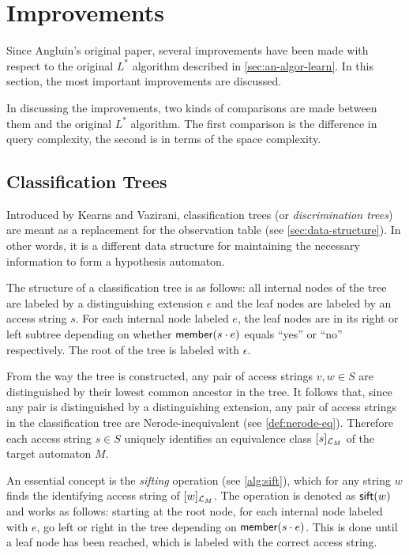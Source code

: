 \documentclass[multi,crop=false,class=article]{standalone}
\begin{document}
\section{Improvements}
\label{sec:improvements}
Since Angluin's original paper, several improvements have been made with respect
to the original $L^*$ algorithm described in \cref{sec:an-algor-learn}. In this
section, the most important improvements are discussed.

In discussing the improvements, two kinds of comparisons are made between them
and the original $L^*$ algorithm. The first comparison is the difference in
query complexity, the second is in terms of the space complexity.

\subsection{Classification Trees}
\label{sec:classification-trees}
Introduced by Kearns and Vazirani\cite{Kearns1994}, classification trees (or
\textit{discrimination trees}) are meant as a replacement for the observation
table (see \cref{sec:data-structure}). In other words, it is a different data
structure for maintaining the necessary information to form a hypothesis
automaton.

The structure of a classification tree is as follows: all internal nodes of the
tree are labeled by a distinguishing extension $e$ and the leaf nodes are
labeled by an access string $s$. For each internal node labeled $e$, the leaf
nodes are in its right or left subtree depending on whether $\mathsf{member}(s\cdot e)$
equals ``yes'' or ``no'' respectively. The root of the tree is labeled with
$\epsilon$.

From the way the tree is constructed, any pair of access strings $v,w \in S$ are
distinguished by their lowest common ancestor in the tree. It follows that,
since any pair is distinguished by a distinguishing extension, any pair of
access strings in the classification tree are Nerode-inequivalent (see
\cref{def:nerode-eq}). Therefore each access string $s \in S$ uniquely
identifies an equivalence class $[s]_{\mathcal{L}_M}$ of the target automaton
$M$.

An essential concept is the \textit{sifting} operation (see \cref{alg:sift}),
which for any string $w$ finds the identifying access string of
$[w]_{\mathcal{L}_M}$. The operation is denoted as $\mathsf{sift}(w)$ and works as
follows: starting at the root node, for each internal node labeled with $e$, go
left or right in the tree depending on $\mathsf{member}(s \cdot e)$. This is done until a
leaf node has been reached, which is labeled with the correct access string.
\end{document}
